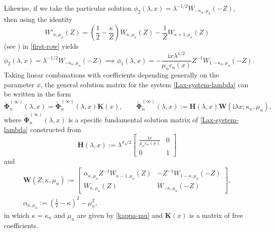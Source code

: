 \documentclass[11pt]{article}
\numberwithin{equation}{section}
\numberwithin{equation}{section}
\newcommand{\ii}{\mathrm{i}}
\newcommand{\para}[1]{\breve{#1}}
\begin{document}
Likewise, if we take the particular solution $\phi_2(\lambda,x)=\lambda^{-1/2}W_{-\kappa_n,\mu_n}(-Z)$, then using the identity
\begin{equation*}
 W'_{\kappa, \mu_n}(Z) = \left( \dfrac{1}{2} - \dfrac{\kappa}{Z} \right)W_{\kappa, \mu_n}(Z) - \dfrac{1}{Z} W_{\kappa+1, \mu_n}(Z)
\end{equation*}
(see \cite[equation~(13.15.26)]{DLMF}) in \eqref{first-row} yields
\begin{equation*}
 \phi_2(\lambda,x)=\lambda^{-1/2}W_{-\kappa_n,\mu_n}(-Z)\implies \phi_1(\lambda,x)=-\frac{\ii x\lambda^{1/2}}{\mu_n c_n(x)}Z^{-1}W_{1-\kappa_n,\mu_n}(-Z).
\end{equation*}
Taking linear combinations with coefficients depending generally on the parameter $x$, the general solution matrix for the system \eqref{Lax-system-lambda} can be written in the form
\begin{equation}
 \para{\boldsymbol\Phi}_n^{(\infty)}(\lambda,x)=\widetilde{\boldsymbol\Phi}^{(\infty)}_n(\lambda,x)\mathbf{K}(x),\qquad\widetilde{\boldsymbol\Phi}_n^{(\infty)}(\lambda,x):=\mathbf{H}(\lambda,x)\mathbf{W}(\ii\lambda x;\kappa_n,\mu_n),
 \label{Psi0-define}
\end{equation}
where $\widetilde{\mathbf{\Phi}}_n^{(\infty)}(\lambda,x)$ is a specific fundamental solution matrix of \eqref{Lax-system-lambda} constructed from
\begin{equation}
 \mathbf{H}(\lambda,x):=\lambda^{\sigma_3/2}\begin{bmatrix}\displaystyle\frac{\ii x}{\mu_n c_n(x)} & 0\\0 & 1\end{bmatrix}
 \label{H-define}
\end{equation}
and
\begin{gather}
 \mathbf{W}(Z;\kappa,\mu_n):=
 \begin{bmatrix}
 \alpha_{\kappa,\mu_n}Z^{-1}W_{\kappa-1,\mu_n}(Z) & -Z^{-1}W_{1-\kappa,\mu_n}(-Z)\\
 W_{\kappa,\mu_n}(Z) & W_{-\kappa,\mu_n}(-Z)
 \end{bmatrix},\nonumber\\ \alpha_{\kappa,\mu_n}:=\left(\frac{1}{2}-\kappa\right)^2-\mu_n^2,
 \label{M-alpha-define}
\end{gather}
in which $\kappa=\kappa_n$ and $\mu_n$ are given by \eqref{kappa-mu} and $\mathbf{K}(x)$ is a matrix of free coefficients.
\end{document}
